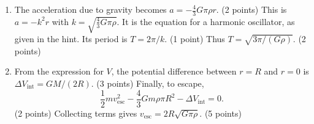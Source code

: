 \begin{enumerate}
\item The acceleration due to gravity becomes $a=-\tfrac43G\pi\rho r$. \hfill(2 points)
This is $a=-k^2r$ with $k=\sqrt{\tfrac43G\pi\rho}$. It is the equation for a harmonic oscillator, as given in the hint. Its period is $T=2\pi/k$. \hfill(1 point)
Thus $T=\sqrt{3\pi/(G\rho)}$. \hfill(2 points)
\item From the expression for $V$, the potential difference between $r=R$ and $r=0$ is $\Delta V_{\mathrm{int}}=GM/(2R)$. \hfill(3 points)
Finally, to escape,
\[\frac12mv_{\mathrm{esc}}^2-\frac43Gm\rho\pi R^2-\Delta V_{\mathrm{int}}=0.\]
\hfill(2 points)
Collecting terms gives $v_{\mathrm{esc}}=2R\sqrt{G\pi\rho}$. \hfill(5 points)
\end{enumerate}
